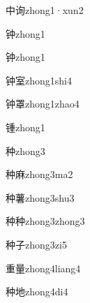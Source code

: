 \begin{verbete}[4;8]{中询}{zhong1·xun2}
\end{verbete}

\begin{verbete}[9]{钟}{zhong1}
\end{verbete}
\begin{verbete*}[9]{钟}{zhong1}
\end{verbete*}

\begin{verbete}[9;9]{钟室}{zhong1shi4}
\end{verbete}

\begin{verbete}[9;13]{钟罩}{zhong1zhao4}
\end{verbete}

\begin{verbete}[9]{锺}{zhong1}
\end{verbete}

\begin{verbete}[9]{种}{zhong3}
\end{verbete}

\begin{verbete}[9;11]{种麻}{zhong3ma2}
\end{verbete}

\begin{verbete}[9;16]{种薯}{zhong3shu3}
\end{verbete}

\begin{verbete}[9;9]{种种}{zhong3zhong3}
\end{verbete}

\begin{verbete}[9;3]{种子}{zhong3zi5}
\end{verbete}

\begin{verbete}[8;12]{重量}{zhong4liang4}
\end{verbete}

\begin{verbete}[9;6]{种地}{zhong4di4}
\end{verbete}

